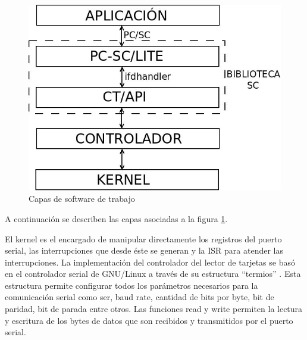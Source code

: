\documentclass[%
        final,
        notitlepage,
        narroweqnarray,
        inline,
        ]{ieee}
\begin{document}
\begin{figure}[h]
\centering
  \begin{center}
  \includegraphics[scale=.35]{../docs/Imagenes/SW_sc1.jpg} 
  \end{center}
  \caption{Capas de software de trabajo}\label{Fig:capas} 
\end{figure}


%
%


A continuación se describen las capas asociadas a la figura \ref{Fig:capas}.


El kernel es el encargado de manipular directamente los registros del puerto serial, las interrupciones que desde éste se generan y la ISR para atender las interrupciones.
La implementación del controlador del lector de tarjetas se basó en el controlador serial de GNU/Linux a través de su estructura “termios” \cite{termios}. Esta estructura permite configurar todos los parámetros necesarios para la comunicación serial como ser, baud rate, cantidad de bits por byte, bit de paridad, bit de parada entre otros. Las funciones read y write permiten la lectura y escritura de los bytes de datos que son recibidos y transmitidos por el puerto serial.
\end{document}
